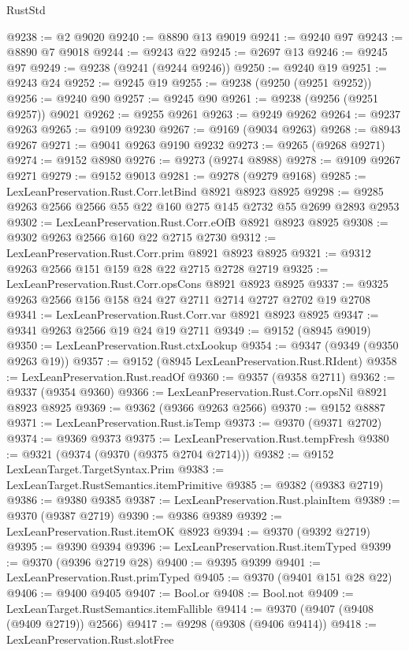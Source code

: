 \begin{lexlean}{RustStd}
\begin{coremodule}
{\begin{coremodule}
{{{{{{{{{{{{{{{{{{{{{{{{{{{{{{{{{{{{{{{@9238 := @2 @9020
@9240 := @8890 @13 @9019
@9241 := @9240 @97
@9243 := @8890 @7 @9018
@9244 := @9243 @22
@9245 := @2697 @13
@9246 := @9245 @97
@9249 := @9238 (@9241 (@9244 @9246))
@9250 := @9240 @19
@9251 := @9243 @24
@9252 := @9245 @19
@9255 := @9238 (@9250 (@9251 @9252))
@9256 := @9240 @90
@9257 := @9245 @90
@9261 := @9238 (@9256 (@9251 @9257)) @9021
@9262 := @9255 @9261
@9263 := @9249 @9262
@9264 := @9237 @9263
@9265 := @9109 @9230
@9267 := @9169 (@9034 @9263)
@9268 := @8943 @9267
@9271 := @9041 @9263 @9190 @9232
@9273 := @9265 (@9268 @9271)
@9274 := @9152 @8980
@9276 := @9273 (@9274 @8988)
@9278 := @9109 @9267 @9271
@9279 := @9152 @9013
@9281 := @9278 (@9279 @9168)
@9285 := LexLeanPreservation.Rust.Corr.letBind @8921 @8923 @8925
@9298 := @9285 @9263 @2566 @2566 @55 @22 @160 @275 @145 @2732 @55 @2699 @2893 @2953
@9302 := LexLeanPreservation.Rust.Corr.eOfB @8921 @8923 @8925
@9308 := @9302 @9263 @2566 @160 @22 @2715 @2730
@9312 := LexLeanPreservation.Rust.Corr.prim @8921 @8923 @8925
@9321 := @9312 @9263 @2566 @151 @159 @28 @22 @2715 @2728 @2719
@9325 := LexLeanPreservation.Rust.Corr.opsCons @8921 @8923 @8925
@9337 := @9325 @9263 @2566 @156 @158 @24 @27 @2711 @2714 @2727 @2702 @19 @2708
@9341 := LexLeanPreservation.Rust.Corr.var @8921 @8923 @8925
@9347 := @9341 @9263 @2566 @19 @24 @19 @2711
@9349 := @9152 (@8945 @9019)
@9350 := LexLeanPreservation.Rust.ctxLookup
@9354 := @9347 (@9349 (@9350 @9263 @19))
@9357 := @9152 (@8945 LexLeanPreservation.Rust.RIdent)
@9358 := LexLeanPreservation.Rust.readOf
@9360 := @9357 (@9358 @2711)
@9362 := @9337 (@9354 @9360)
@9366 := LexLeanPreservation.Rust.Corr.opsNil @8921 @8923 @8925
@9369 := @9362 (@9366 @9263 @2566)
@9370 := @9152 @8887
@9371 := LexLeanPreservation.Rust.isTemp
@9373 := @9370 (@9371 @2702)
@9374 := @9369 @9373
@9375 := LexLeanPreservation.Rust.tempFresh
@9380 := @9321 (@9374 (@9370 (@9375 @2704 @2714)))
@9382 := @9152 LexLeanTarget.TargetSyntax.Prim
@9383 := LexLeanTarget.RustSemantics.itemPrimitive
@9385 := @9382 (@9383 @2719)
@9386 := @9380 @9385
@9387 := LexLeanPreservation.Rust.plainItem
@9389 := @9370 (@9387 @2719)
@9390 := @9386 @9389
@9392 := LexLeanPreservation.Rust.itemOK @8923
@9394 := @9370 (@9392 @2719)
@9395 := @9390 @9394
@9396 := LexLeanPreservation.Rust.itemTyped
@9399 := @9370 (@9396 @2719 @28)
@9400 := @9395 @9399
@9401 := LexLeanPreservation.Rust.primTyped
@9405 := @9370 (@9401 @151 @28 @22)
@9406 := @9400 @9405
@9407 := Bool.or
@9408 := Bool.not
@9409 := LexLeanTarget.RustSemantics.itemFallible
@9414 := @9370 (@9407 (@9408 (@9409 @2719)) @2566)
@9417 := @9298 (@9308 (@9406 @9414))
@9418 := LexLeanPreservation.Rust.slotFree
}}}}}}}}}}}}}}}}}}}}}}}}}}}}}}}}}}}}}}}
\end{coremodule}}
\end{coremodule}
\end{lexlean}
